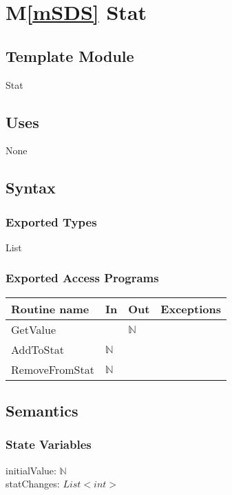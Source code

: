\documentclass[12pt]{article}
\newcommand{\mref}[1]{M\ref{#1}}
\begin{document}
\newpage

\section* {\mref{mSDS} Stat}

\subsection*{Template Module}

Stat

\subsection* {Uses}

None

\subsection* {Syntax}

\subsubsection* {Exported Types}

List

\subsubsection* {Exported Access Programs}

\begin{tabular}{| l | l | l | l |}
\hline
\textbf{Routine name} & \textbf{In} & \textbf{Out} & \textbf{Exceptions}\\
\hline
GetValue & ~ & $\mathbb{N}$  & ~\\
AddToStat & $\mathbb{N}$  & ~ & ~\\
RemoveFromStat & $\mathbb{N}$  & ~ & ~\\
\hline
\end{tabular}

\subsection* {Semantics}

\subsubsection* {State Variables}

initialValue: $\mathbb{N}$ \\
statChanges: $List<int>$ \\
\end{document}
